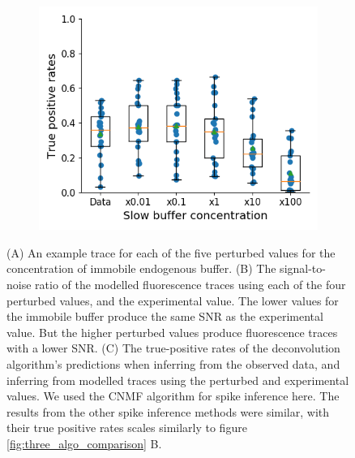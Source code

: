 \begin{figure}[p]
\begin{subfigure}{0.45\textwidth}
        \includegraphics[width=\linewidth]{figures/calcium_chapter/immobile_perturbed_oasis_first_paper.png}
        \caption{}
    \end{subfigure}
    \caption{(A) An example trace for each of the five perturbed values for the concentration of immobile endogenous buffer.	(B) The signal-to-noise ratio of the modelled fluorescence traces using each of the four perturbed values, and the experimental value. The lower values for the immobile buffer produce the same SNR as the experimental value. But the higher perturbed values produce fluorescence traces with a lower SNR.	(C) The true-positive rates of the deconvolution algorithm's predictions when inferring from the observed data, and inferring from modelled traces using the perturbed and experimental values. We used the CNMF algorithm for spike inference here. The results from the other spike inference methods were similar, with their true positive rates scales similarly to figure \ref{fig:three_algo_comparison} B.}
    \label{fig:endogenous_perturbed}
\end{figure}

